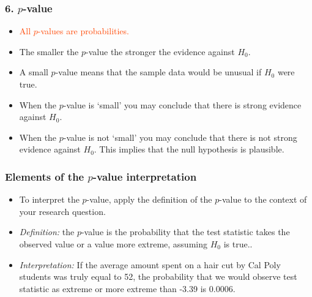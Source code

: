 \begin{frame}
\frametitle{6. $p$-value}
\begin{itemize}
    \item
    \textcolor{OrangeRed}{All $p$-values are probabilities.}
    \item
    The smaller the $p$-value the stronger the evidence against $H_0$.
    \item
    A small $p$-value means that the sample data would be unusual if $H_0$ were true.
    \item
    When the $p$-value is `small' you may conclude that there is strong evidence against $H_0$.
    \item
    When the $p$-value is not `small' you may conclude that there is not strong evidence against $H_0$. This implies that the null hypothesis is plausible.
\end{itemize}
\end{frame}


\begin{frame}
\frametitle{Elements of the $p$-value interpretation}
\begin{itemize}
\item To interpret the $p$-value, apply the definition of the $p$-value to the context of your research question.
\item \emph{Definition:} the $p$-value is the probability that the test statistic takes the observed value or a value more extreme, assuming $H_0$ is true..
\item \emph{Interpretation:}  If the average amount spent on a hair cut by Cal Poly students was truly equal to 52, the probability that we would observe test statistic as extreme or more extreme than -3.39 is 0.0006.
\end{itemize}
\end{frame}



